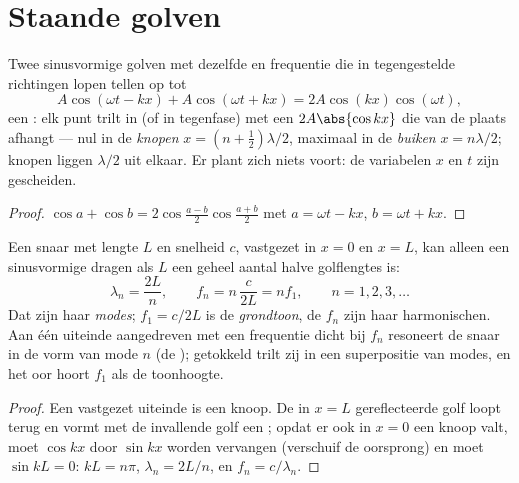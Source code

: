 \section{Staande golven}

\begin{theorem}\label{thm:b1:wave-propagation:standing}
Twee sinusvormige golven met dezelfde  en frequentie die in
tegengestelde richtingen lopen tellen op tot
\[
A\cos(\omega t - kx) + A\cos(\omega t + kx) = 2A\cos(kx)\cos(\omega t),
\]
een \emph{}: elk punt trilt in  (of in tegenfase) met een
 $2A\abs{\cos kx}$ die van de plaats afhangt ---
nul in de \emph{knopen} $x = (n + \tfrac12)\lambda/2$, maximaal in de
\emph{buiken} $x = n\lambda/2$; knopen liggen $\lambda/2$ uit elkaar. Er plant
zich niets voort: de variabelen $x$ en $t$ zijn gescheiden.
\end{theorem}

\begin{proof}
$\cos a + \cos b = 2\cos\frac{a - b}{2}\cos\frac{a + b}{2}$ met
$a = \omega t - kx$, $b = \omega t + kx$.
\end{proof}

\begin{proposition}\label{prop:b1:wave-propagation:modes}
Een snaar met lengte $L$ en snelheid $c$, vastgezet in $x = 0$ en $x = L$, kan
alleen een sinusvormige  dragen als $L$ een geheel aantal halve
golflengtes is:
\[
\lambda_n = \frac{2L}{n}, \qquad f_n = n\,\frac{c}{2L} = n f_1,
\qquad n = 1, 2, 3, \dots
\]
Dat zijn haar \emph{modes}; $f_1 = c/2L$ is de \emph{grondtoon},
de $f_n$ zijn haar harmonischen. Aan één uiteinde aangedreven met een
frequentie dicht bij $f_n$ resoneert de snaar in de vorm van mode $n$ (de
); getokkeld trilt zij in een superpositie van modes, en het
oor hoort $f_1$ als de toonhoogte.
\end{proposition}

\begin{proof}
Een vastgezet uiteinde is een knoop. De in $x = L$ gereflecteerde golf loopt
terug en vormt met de invallende golf een ; opdat er ook in
$x = 0$ een knoop valt, moet $\cos kx$ door $\sin kx$ worden vervangen (verschuif
de oorsprong) en moet $\sin kL = 0$: $kL = n\pi$, $\lambda_n = 2L/n$, en
$f_n = c/\lambda_n$.
\end{proof}

